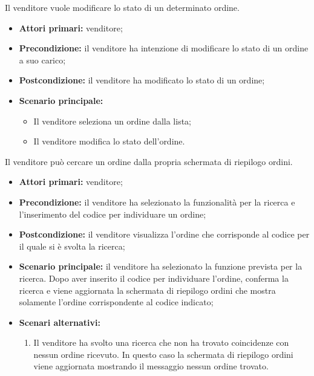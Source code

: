 Il venditore vuole modificare lo stato di un determinato ordine.
\begin{itemize}
	\item \textbf{Attori primari:} venditore;
	\item \textbf{Precondizione:} il venditore ha intenzione di modificare lo stato di un ordine a suo carico;
	\item \textbf{Postcondizione:} il venditore ha modificato lo stato di un ordine;
	\item \textbf{Scenario principale:}
	\begin{itemize}
		\item Il venditore seleziona un ordine dalla lista;
		\item Il venditore modifica lo stato dell'ordine.
	\end{itemize}
\end{itemize}

Il venditore può cercare un ordine dalla propria schermata di riepilogo ordini.
\begin{itemize}
	\item \textbf{Attori primari:} venditore;
	\item \textbf{Precondizione:} il venditore ha selezionato la funzionalità per la ricerca e l'inserimento del codice per individuare un ordine;
	\item \textbf{Postcondizione:} il venditore visualizza l'ordine che corrisponde al codice per il quale si è svolta la ricerca;
	\item \textbf{Scenario principale:} il venditore ha selezionato la funzione prevista per la ricerca. Dopo aver inserito il codice per individuare l'ordine, conferma la ricerca e viene aggiornata la schermata di riepilogo ordini che mostra solamente l'ordine corrispondente al codice indicato;
	\item \textbf{Scenari alternativi:}
	\begin{enumerate}[label=\lett]
		\item Il venditore ha svolto una ricerca che non ha trovato coincidenze con nessun ordine ricevuto. In questo caso la schermata di riepilogo ordini viene aggiornata mostrando il messaggio nessun ordine trovato.
	\end{enumerate}
\end{itemize}


